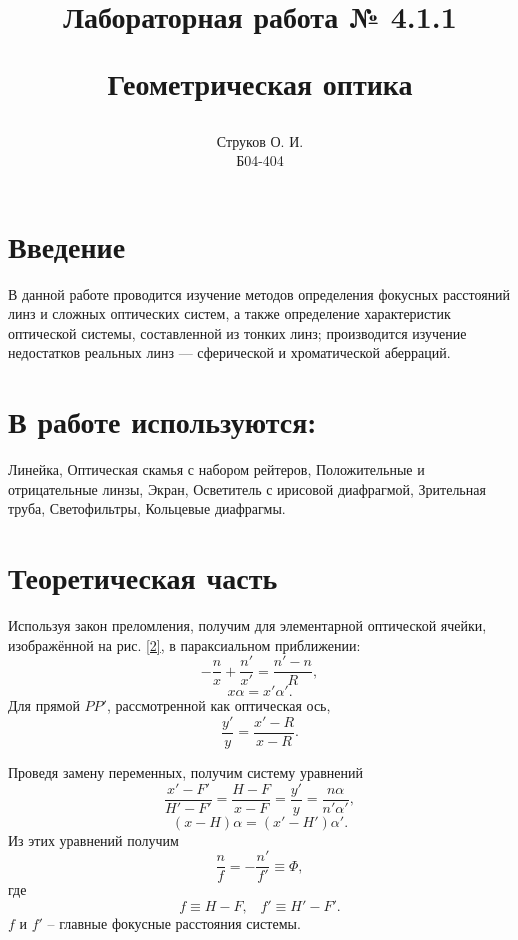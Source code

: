 \documentclass[12pt,a4paper]{article}
\newcommand{\picref}[1]{рис. \ref{#1}}
\begin{document}
\title{\begin{center}Лабораторная работа № 4.1.1\end{center}
Геометрическая оптика}
\author{Струков О. И. \\ Б04-404}
\date{}

\thispagestyle{empty}
\maketitle
\newpage
{}
\section*{Введение}
В данной работе проводится изучение методов определения фокусных расстояний линз и сложных оптических систем, а также определение характеристик оптической системы, составленной из тонких линз; производится изучение недостатков реальных линз — сферической и хроматической аберраций.
\section*{В работе используются:}

Линейка,
Оптическая скамья с набором рейтеров,
Положительные и отрицательные линзы,
Экран,
Осветитель с ирисовой диафрагмой,
Зрительная труба,
Светофильтры,
Кольцевые диафрагмы.

\section*{Теоретическая часть}


Используя закон преломления, получим для элементарной оптической ячейки, изображённой на \picref{2}, в параксиальном приближении:
\begin{equation}\label{опт-ячейка}
	-\frac{n}{x}+\frac{n'}{x'} = \frac{n'-n}{R},
\end{equation}
\begin{equation}
	x \alpha = x' \alpha'.
\end{equation}
Для прямой $ P P' $, рассмотренной как оптическая ось, 
\begin{equation}\label{PP}
	\frac{y'}{y} = \frac{x' - R}{x - R}.
\end{equation}

Проведя замену переменных, получим систему уравнений
\begin{equation}\label{grid}
	\frac{x' - F'}{H' - F'}= \frac{H-F}{x- F} = \frac{y'}{y} = \frac{n \alpha}{n' \alpha'},
\end{equation}
\begin{equation}\label{grid1}
	(x-H)\alpha= (x' - H')\alpha'.
\end{equation}
Из этих уравнений получим
\begin{equation}\label{Ф}
	\frac{n}{f} = -\frac{n'}{f'} \equiv \Phi,
\end{equation}
где
\begin{equation}\label{focus-len}
	f\equiv H - F, \;\;\; f'\equiv H' - F'.
\end{equation}
$ f $ и $ f' $ -- главные фокусные расстояния системы.
\end{document}
